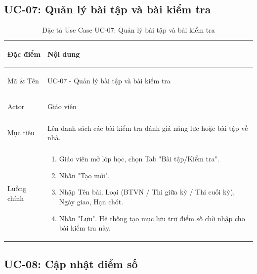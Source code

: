 \subsection{UC-07: Quản lý bài tập và bài kiểm tra}

\begin{table}[htbp]
\centering
\small
\caption{Đặc tả Use Case UC-07: Quản lý bài tập và bài kiểm tra}
\label{tab:uc07-quan-ly-bai-tap}
\begin{tabularx}{\textwidth}{|>{\bfseries\raggedright\arraybackslash}p{2.5cm}|X|}
\hline
Đặc điểm & Nội dung \\ \hline
Mã \& Tên & UC-07 - Quản lý bài tập và bài kiểm tra \\ \hline
Actor & Giáo viên \\ \hline
Mục tiêu & Lên danh sách các bài kiểm tra đánh giá năng lực hoặc bài tập về nhà. \\ \hline
Luồng chính & 
\begin{enumerate}
    \item Giáo viên mở lớp học, chọn Tab "Bài tập/Kiểm tra".
    \item Nhấn "Tạo mới".
    \item Nhập Tên bài, Loại (BTVN / Thi giữa kỳ / Thi cuối kỳ), Ngày giao, Hạn chót.
    \item Nhấn "Lưu". Hệ thống tạo mục lưu trữ điểm số chờ nhập cho bài kiểm tra này.
\end{enumerate} \\ \hline
\end{tabularx}
\end{table}

\clearpage
\subsection{UC-08: Cập nhật điểm số}

